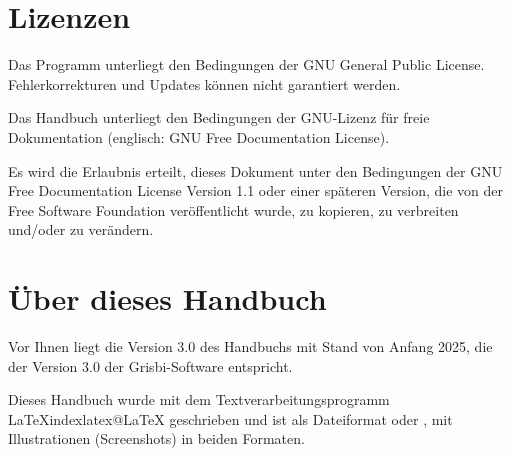\section{Lizenzen\label{introduction-licenses}}


Das Programm unterliegt den Bedingungen der \gls{GNU General Public License}. Fehlerkorrekturen und Updates können nicht garantiert werden.

Das Handbuch unterliegt den Bedingungen der \gls{GNU-Lizenz für freie Dokumentation} (englisch: GNU Free Documentation License).

Es wird die Erlaubnis erteilt, dieses Dokument unter den Bedingungen der GNU Free Documentation License Version 1.1 oder einer späteren Version, die von der \gls{Free Software Foundation} veröffentlicht wurde, zu kopieren, zu verbreiten und/oder zu verändern.

\section{Über dieses Handbuch\label{introduction-manual}}


Vor Ihnen liegt die Version 3.0 des Handbuchs mit Stand von \actuality{}Anfang 2025, die der Version 3.0 der Grisbi-Software entspricht.




Dieses Handbuch wurde mit dem Textverarbeitungsprogramm \gls{LaTeX}index{latex@LaTeX} geschrieben und ist als \gls{Dateiformat}  oder , mit Illustrationen (Screenshots) in beiden Formaten.


